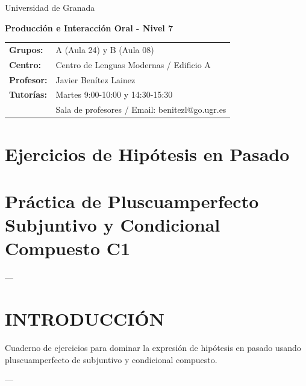 \documentclass[a4paper,11pt]{article}
\begin{document}
\begin{center}
\small{Universidad de Granada}

\vspace{0.3cm}

\textbf{\large{Producción e Interacción Oral - Nivel 7}}

\vspace{0.4cm}

\small
\begin{tabular}{@{}ll@{}}
\textbf{Grupos:} & A (Aula 24) y B (Aula 08) \\
\textbf{Centro:} & Centro de Lenguas Modernas / Edificio A \\
\textbf{Profesor:} & Javier Benítez Lainez \\
\textbf{Tutorías:} & Martes 9:00-10:00 y 14:30-15:30 \\
& Sala de profesores / Email: benitezl@go.ugr.es
\end{tabular}
\end{center}

\vspace{0.5cm}
\section*{Ejercicios de Hipótesis en Pasado}

\vspace{0.4cm}

\section{Práctica de Pluscuamperfecto Subjuntivo y Condicional Compuesto C1}

\vspace{0.2cm}

---

\vspace{0.2cm}

\section{INTRODUCCIÓN}

\vspace{0.2cm}

Cuaderno de ejercicios para dominar la expresión de hipótesis en pasado usando pluscuamperfecto de subjuntivo y condicional compuesto.

\vspace{0.2cm}

---
\end{document}
